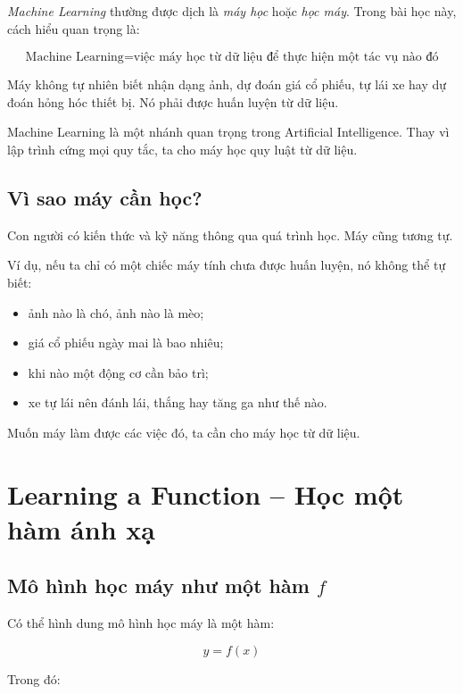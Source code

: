 \textit{Machine Learning} thường được dịch là \textit{máy học} hoặc \textit{học máy}. Trong bài học này, cách hiểu quan trọng là:

\[
    \text{Machine Learning}
    =
    \text{việc máy học từ dữ liệu để thực hiện một tác vụ nào đó}
\]

Máy không tự nhiên biết nhận dạng ảnh, dự đoán giá cổ phiếu, tự lái xe hay dự đoán hỏng hóc thiết bị. Nó phải được huấn luyện từ dữ liệu.

\begin{ghinho}
Machine Learning là một nhánh quan trọng trong Artificial Intelligence. Thay vì lập trình cứng mọi quy tắc, ta cho máy học quy luật từ dữ liệu.
\end{ghinho}

\subsection{Vì sao máy cần học?}

Con người có kiến thức và kỹ năng thông qua quá trình học. Máy cũng tương tự.

Ví dụ, nếu ta chỉ có một chiếc máy tính chưa được huấn luyện, nó không thể tự biết:

\begin{itemize}
    \item ảnh nào là chó, ảnh nào là mèo;
    \item giá cổ phiếu ngày mai là bao nhiêu;
    \item khi nào một động cơ cần bảo trì;
    \item xe tự lái nên đánh lái, thắng hay tăng ga như thế nào.
\end{itemize}

Muốn máy làm được các việc đó, ta cần cho máy học từ dữ liệu.

\section{Learning a Function -- Học một hàm ánh xạ}

\subsection{Mô hình học máy như một hàm $f$}

Có thể hình dung mô hình học máy là một hàm:

\[
    y = f(x)
\]

Trong đó:


